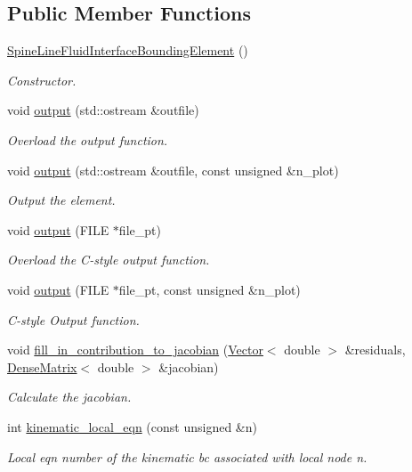 \subsection*{Public Member Functions}
\begin{DoxyCompactItemize}
\item 
\hyperlink{classoomph_1_1SpineLineFluidInterfaceBoundingElement_a27c79d149485d2269ed42136914635e1}{Spine\+Line\+Fluid\+Interface\+Bounding\+Element} ()
\begin{DoxyCompactList}\small\item\em Constructor. \end{DoxyCompactList}\item 
void \hyperlink{classoomph_1_1SpineLineFluidInterfaceBoundingElement_a5c074690d693fa7fb349b22e926064b4}{output} (std\+::ostream \&outfile)
\begin{DoxyCompactList}\small\item\em Overload the output function. \end{DoxyCompactList}\item 
void \hyperlink{classoomph_1_1SpineLineFluidInterfaceBoundingElement_a77acf17ce730f50acd0d850e7460fc4d}{output} (std\+::ostream \&outfile, const unsigned \&n\+\_\+plot)
\begin{DoxyCompactList}\small\item\em Output the element. \end{DoxyCompactList}\item 
void \hyperlink{classoomph_1_1SpineLineFluidInterfaceBoundingElement_ab34fbdcd7785ab6a731a3b5d50896829}{output} (F\+I\+LE $\ast$file\+\_\+pt)
\begin{DoxyCompactList}\small\item\em Overload the C-\/style output function. \end{DoxyCompactList}\item 
void \hyperlink{classoomph_1_1SpineLineFluidInterfaceBoundingElement_ab1dbf8b8c22f78d08d431e06db80793a}{output} (F\+I\+LE $\ast$file\+\_\+pt, const unsigned \&n\+\_\+plot)
\begin{DoxyCompactList}\small\item\em C-\/style Output function. \end{DoxyCompactList}\item 
void \hyperlink{classoomph_1_1SpineLineFluidInterfaceBoundingElement_a3f44f30b5cdc47b997dbc3fd463d2038}{fill\+\_\+in\+\_\+contribution\+\_\+to\+\_\+jacobian} (\hyperlink{classoomph_1_1Vector}{Vector}$<$ double $>$ \&residuals, \hyperlink{classoomph_1_1DenseMatrix}{Dense\+Matrix}$<$ double $>$ \&jacobian)
\begin{DoxyCompactList}\small\item\em Calculate the jacobian. \end{DoxyCompactList}\item 
int \hyperlink{classoomph_1_1SpineLineFluidInterfaceBoundingElement_a0c31dba3e151540261753679b431b04a}{kinematic\+\_\+local\+\_\+eqn} (const unsigned \&n)
\begin{DoxyCompactList}\small\item\em Local eqn number of the kinematic bc associated with local node n. \end{DoxyCompactList}\end{DoxyCompactItemize}

